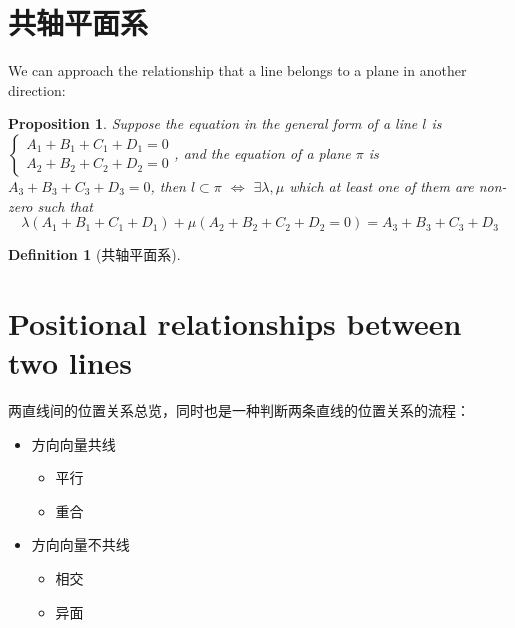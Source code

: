 \documentclass[onecolumn]{ctexart}
\newtheorem{definition}{Definition}
\newtheorem{proposition}{Proposition}
\begin{document}
\section{共轴平面系}
We can approach the relationship that a line belongs to a plane in another 
direction:
\begin{proposition}
  Suppose the equation in the general form of a line $l$ is $
  \begin{cases}
    A_1 + B_1 + C_1 + D_1 = 0 \\
    A_2 + B_2 + C_2 + D_2 = 0
  \end{cases}$, and the equation of a plane $\pi$ is $A_3 + B_3 + C_3 + D_3 = 0$, 
  then $l \subset \pi$ $\Leftrightarrow$ $\exists \lambda, \mu$ which at least 
  one of them are non-zero such that
  \begin{equation}
    \lambda (A_1 + B_1 + C_1 + D_1) + \mu (A_2 + B_2 + C_2 + D_2 = 0) = A_3 + B_3 + C_3 + D_3
  \end{equation}
\end{proposition}

\begin{definition}[共轴平面系]
  
\end{definition}

\section{Positional relationships between two lines}
两直线间的位置关系总览，同时也是一种判断两条直线的位置关系的流程：
\begin{itemize}
  \item 方向向量共线
  \begin{itemize}
    \item 平行
    \item 重合
  \end{itemize}
  \item 方向向量不共线
  \begin{itemize}
    \item 相交
    \item 异面
  \end{itemize}
\end{itemize}
\end{document}
